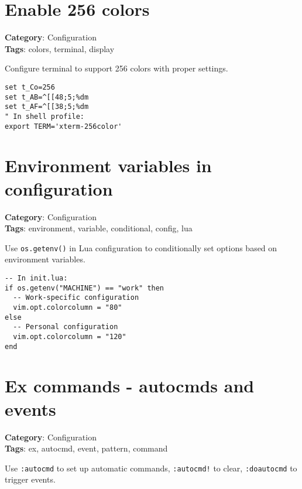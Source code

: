 {{{{\section{Enable 256 colors}

\textbf{Category}: Configuration\\ \textbf{Tags}: colors, terminal, display
\vspace{0.5cm}

Configure terminal to support 256 colors with proper settings.

\begin{Exa*}{}
\begin{Verbatim}[fontsize=\footnotesize, breaklines, breakanywhere]
set t_Co=256
set t_AB=^[[48;5;%dm
set t_AF=^[[38;5;%dm
" In shell profile:
export TERM='xterm-256color'
\end{Verbatim}
\end{Exa*}

\section{Environment variables in configuration}

\textbf{Category}: Configuration\\ \textbf{Tags}: environment, variable, conditional, config, lua
\vspace{0.5cm}

Use {\footnotesize \Verb§os.getenv()§} in Lua configuration to conditionally set options based on environment variables.

\begin{Exa*}{}
\begin{Verbatim}[fontsize=\footnotesize, breaklines, breakanywhere]
-- In init.lua:
if os.getenv("MACHINE") == "work" then
  -- Work-specific configuration
  vim.opt.colorcolumn = "80"
else  
  -- Personal configuration
  vim.opt.colorcolumn = "120"
end
\end{Verbatim}
\end{Exa*}

\section{Ex commands - autocmds and events}

\textbf{Category}: Configuration\\ \textbf{Tags}: ex, autocmd, event, pattern, command
\vspace{0.5cm}

Use {\footnotesize \Verb§:autocmd§} to set up automatic commands, {\footnotesize \Verb§:autocmd!§} to clear, {\footnotesize \Verb§:doautocmd§} to trigger events.

}}}}
